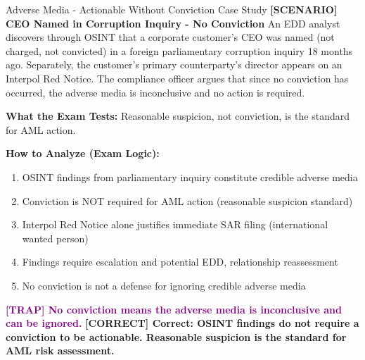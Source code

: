 \documentclass[11pt,a4paper]{beamer}
\newcommand{\trap}[1]{\textcolor{purple}{\textbf{[TRAP] #1}}}
\newcommand{\correct}[1]{\textcolor{green!50!black}{\textbf{[CORRECT] #1}}}
\newcommand{\scenario}[1]{\textcolor{blue!70!black}{\textbf{[SCENARIO] #1}}}
\begin{document}
	\begin{frame}{Adverse Media - Actionable Without Conviction Case Study}
		\scenario{CEO Named in Corruption Inquiry - No Conviction}
		An EDD analyst discovers through OSINT that a corporate customer's CEO was named (not charged, not convicted) in a foreign parliamentary corruption inquiry 18 months ago. Separately, the customer's primary counterparty's director appears on an Interpol Red Notice. The compliance officer argues that since no conviction has occurred, the adverse media is inconclusive and no action is required.
		
		\textbf{What the Exam Tests:} Reasonable suspicion, not conviction, is the standard for AML action.
		
		\textbf{How to Analyze (Exam Logic):}
		\begin{enumerate}
			\item OSINT findings from parliamentary inquiry constitute credible adverse media
			\item Conviction is NOT required for AML action (reasonable suspicion standard)
			\item Interpol Red Notice alone justifies immediate SAR filing (international wanted person)
			\item Findings require escalation and potential EDD, relationship reassessment
			\item No conviction is not a defense for ignoring credible adverse media
		\end{enumerate}
		
		\trap{No conviction means the adverse media is inconclusive and can be ignored.}
		\correct{Correct: OSINT findings do not require a conviction to be actionable. Reasonable suspicion is the standard for AML risk assessment.}
	\end{frame}
	
\end{document}
